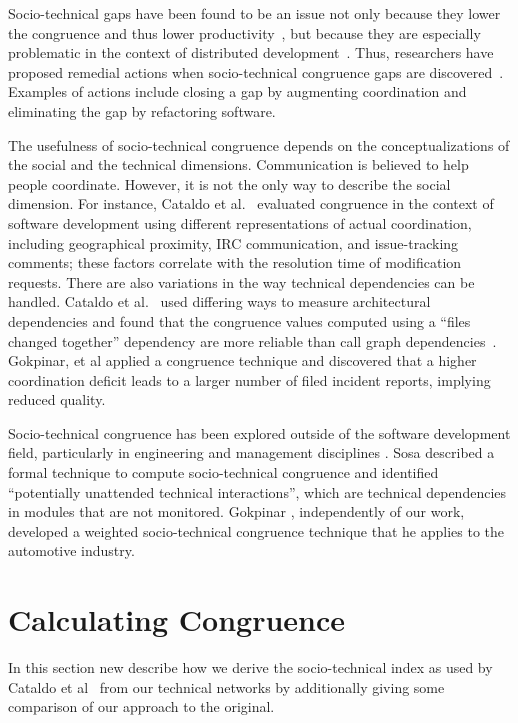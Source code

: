 Socio-technical gaps have been found to be an issue not only because they lower
the congruence and thus lower productivity~\cite{cataldo:cscw:2006}, but because they are especially problematic in the context of distributed development~\cite{ehrlich2008:gaps}. Thus, researchers have proposed remedial actions when socio-technical congruence gaps are discovered~\cite{valetto2007:value}. 
Examples of actions include closing a gap by augmenting coordination and eliminating the gap by refactoring software.

The usefulness of socio-technical congruence depends on the conceptualizations of
the social and the technical dimensions. Communication is believed to help people coordinate. However, it is not the only way to describe the social dimension. 
For instance, Cataldo et al.~\cite{cataldo:cscw:2006} evaluated congruence in the context of software development using different representations of actual coordination, including geographical proximity, IRC communication, and issue-tracking comments; these factors correlate with the resolution time of modification requests. There are also variations in the way technical dependencies can be handled. Cataldo et al.~\cite{cataldo:esem:2008} used differing ways to measure architectural dependencies and found that the congruence values computed using a ``files changed together'' dependency are more reliable than call graph dependencies~\cite{deSouza2004:thwarts_collaboration}. Gokpinar, et al \cite{gokpinar2010} applied a congruence technique and discovered that a higher coordination deficit leads to a larger number of filed incident reports, implying reduced quality.

Socio-technical congruence has been explored outside of the software development field, particularly in engineering and management disciplines \cite{henderson1990,sosa2004:manage,gokpinar2010,sosa2008}. Sosa \cite{sosa2008} described a formal technique to compute socio-technical congruence and identified ``potentially unattended technical interactions'', which are technical dependencies in modules that are not monitored. Gokpinar \cite{gokpinar2010}, independently of our work, developed a weighted socio-technical congruence technique that he applies to the automotive industry.




\section{Calculating Congruence}
\label{sec:congruence}
In this section new describe how we derive the socio-technical index as used by Cataldo et al~\cite{} from our technical networks by additionally giving some comparison of our approach to the original.

